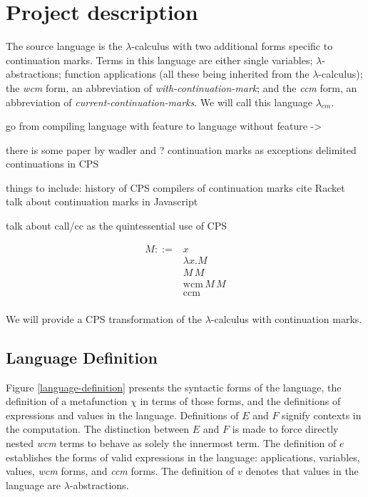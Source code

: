 \documentclass[ms]{byuprop}
\newcounter{definition}
\begin{document}
\section{Project description}

The source language is the $\lambda$-calculus with two additional forms specific to continuation 
marks. Terms in this language are either single variables; $\lambda$-abstractions; function 
applications (all these being inherited from the $\lambda$-calculus); the \emph{wcm} form, an 
abbreviation of \emph{with-continuation-mark}; and the \emph{ccm} form, an abbreviation of 
\emph{current-continuation-marks}. We will call this language $\lambda_{cm}$.

go from compiling language with feature to language without feature -> 

there is some paper by wadler and ?
continuation marks as exceptions
delimited continuations in CPS

things to include:
history of CPS
compilers of continuation marks
cite Racket
talk about continuation marks in Javascript


talk about call/cc as the quintessential use of CPS

\begin{align*}
M ::= &x\\
      &\lambda x.M\\
      &M\,M\\
      &\mathrm{wcm}\,M\,M\\
      &\mathrm{ccm}\\
\end{align*}

We will provide a CPS transformation of the $\lambda$-calculus with continuation marks.

\subsection{Language Definition}

Figure \ref{language-definition} presents the syntactic forms of the language, the 
definition of a metafunction $\chi$ in terms of those forms, and the definitions of 
expressions and values in the language. Definitions of $E$ and $F$ signify contexts in the 
computation. The distinction between $E$ and $F$ is made to force directly nested 
\emph{wcm} terms to behave as solely the innermost term. The definition of $e$ establishes 
the forms of valid expressions in the language: applications, variables, values, \emph{wcm} 
forms, and \emph{ccm} forms. The definition of $v$ denotes that values in the language 
are $\lambda$-abstractions.
\end{document}
